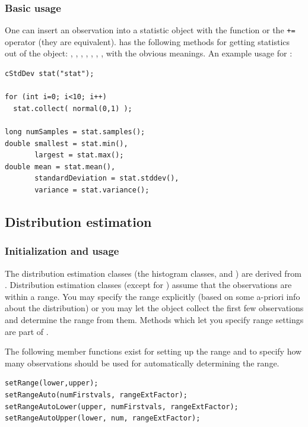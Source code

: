 \subsubsection{Basic usage}

One can insert an observation into a statistic object with the
 function or the \texttt{+=} operator (they are
equivalent).   has the following methods for getting
statistics out of the object: , ,
, , , ,
,  with the obvious meanings. An example
usage for :

\begin{verbatim}
cStdDev stat("stat");

for (int i=0; i<10; i++)
  stat.collect( normal(0,1) );

long numSamples = stat.samples();
double smallest = stat.min(),
       largest = stat.max();
double mean = stat.mean(),
       standardDeviation = stat.stddev(),
       variance = stat.variance();
\end{verbatim}





\subsection{Distribution estimation}

\subsubsection{Initialization and usage}


The distribution estimation classes (the histogram classes,
 and ) are derived from
. Distribution estimation classes (except for
) assume that the observations are within a range.
You may specify the range explicitly (based on some a-priori info
about the distribution) or you may let the object collect the first
few observations and determine the range from them. Methods which let
you specify range settings are part of .

The following member functions exist for setting up the range
and to specify how many observations should be used for
automatically determining the range.

\begin{verbatim}
setRange(lower,upper);
setRangeAuto(numFirstvals, rangeExtFactor);
setRangeAutoLower(upper, numFirstvals, rangeExtFactor);
setRangeAutoUpper(lower, num, rangeExtFactor);
\end{verbatim}

